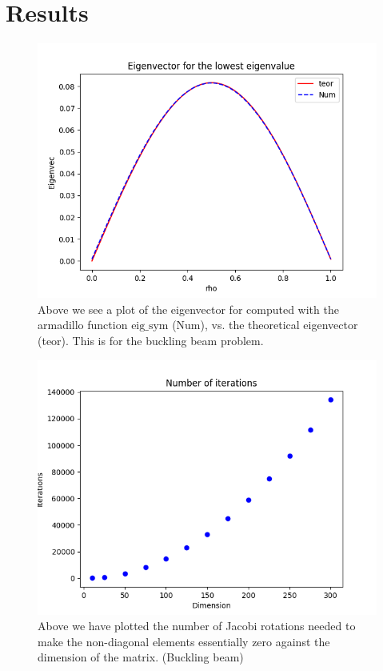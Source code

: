 \documentclass[norsk,a4paper,12pt]{article}
\begin{document}
\section{Results}
\begin{figure}[H]
	\centering
	\includegraphics[width=\linewidth]{Egenvektorer1.png}
	\caption{Above we see a plot of the eigenvector for computed with the armadillo function $\text{eig\_sym}$ ($\text{Num}$), vs. the theoretical eigenvector (teor). This is for the buckling beam problem.}
	\label{fig:egen1}
\end{figure}

\begin{figure}[H]
	\centering
	\includegraphics[width=\linewidth]{Iterasjoner.png}
	\caption{Above we have plotted the number of Jacobi rotations needed to make the non-diagonal elements essentially zero against the dimension of the matrix. (Buckling beam)}
	\label{fig:iter}
\end{figure}
\end{document}
